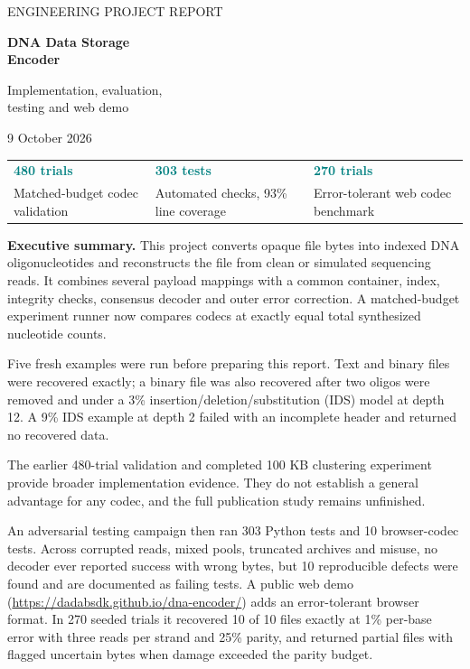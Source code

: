 \documentclass[11pt,a4paper]{article}
\begin{document}
\thispagestyle{empty}
{\color{teal}\large ENGINEERING PROJECT REPORT}\par\vspace{8mm}
{\color{navy}\Huge\bfseries DNA Data Storage\\[4pt]Encoder}\par\vspace{5mm}
{\Large Implementation, evaluation,\\testing and web demo}\par\vspace{5mm}
{\large 9 October 2026}\par
\vspace{6mm}
\begin{tabularx}{\linewidth}{YYY}
\toprule
\textcolor{teal}{\Large\bfseries 480 trials} & \textcolor{teal}{\Large\bfseries 303 tests} & \textcolor{teal}{\Large\bfseries 270 trials}\\
Matched-budget codec validation & Automated checks, 93\% line coverage & Error-tolerant web codec benchmark\\
\bottomrule
\end{tabularx}\par
\vspace{6mm}
\textbf{Executive summary.} This project converts opaque file bytes into indexed DNA
oligonucleotides and reconstructs the file from clean or simulated sequencing reads.
It combines several payload mappings with a common container, index, integrity checks,
consensus decoder and outer error correction. A matched-budget experiment runner now
compares codecs at exactly equal total synthesized nucleotide counts.

Five fresh examples were run before preparing this report. Text and binary files were
recovered exactly; a binary file was also recovered after two oligos were removed and
under a 3\% insertion/deletion/substitution (IDS) model at depth 12. A 9\% IDS example
at depth 2 failed with an incomplete header and returned no recovered data.

The earlier 480-trial validation and completed 100 KB clustering experiment provide
broader implementation evidence. They do not establish a general advantage for any
codec, and the full publication study remains unfinished.

An adversarial testing campaign then ran 303 Python tests and 10 browser-codec
tests. Across corrupted reads, mixed pools, truncated archives and misuse, no decoder ever
reported success with wrong bytes, but 10 reproducible defects were found and are
documented as failing tests. A public web demo
(\url{https://dadabsdk.github.io/dna-encoder/}) adds an error-tolerant browser format. In
270 seeded trials it recovered 10 of 10 files exactly at 1\% per-base
error with three reads per strand and 25\% parity, and returned partial files with flagged
uncertain bytes when damage exceeded the parity budget.
\end{document}
